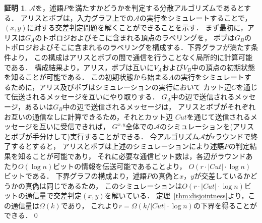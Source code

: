 \documentclass[12pt]{thesis}
\theoremstyle{definition}
\newtheorem*{prf*}{証明}
\begin{document}
\begin{prf*}
$\mathcal{A}$を，述語$P$を満たすかどうかを判定する分散アルゴリズムであるとする．
アリスとボブは，入力グラフ上での$\mathcal{A}$の実行をシミュレートすることで，
$(x, y)$に対する交差判定問題を解くことができることを示す．
まず最初に，アリスは$G_{A}$のトポロジおよびそこに含まれる頂点のラベリングを，
ボブは$G_{B}$のトポロジおよびそこに含まれるのラベリングを構成する．下界グラフが満たす条件より，
この構成はアリスとボブの間で通信を行うことなく局所的に計算可能である．
構成結果より，アリス，ボブは互いに$V_A$および$V_B$中の頂点の初期状態を知ることが可能である．
この初期状態から始まる$A$の実行をシミュレートするために，アリス及びボブはシミュレーションの実行において
カット辺$C$を通じて伝送されるメッセージを互いにやり取りする．
$G_{A}$中の辺で送信されるメッセージ，あるいは$G_{B}$中の辺で送信されるメッセージは，
アリスとボブがそれぞれお互いの通信なしに計算できるため，それとカット辺
$\mathit{Cut}$を通じて送信されるメッセージを互いに受信できれば，
$G^{x,y}$全体での$\mathcal{A}$のシミュレーションを(アリスとボブが手分けして)実行することができる．
今アルゴリズム$\mathcal{A}$が$r$ラウンドで終了するとすると，
アリスとボブは上述のシミュレーションにより述語$P$の判定結果を知ることが可能であり，
それに必要な通信ビット数は，各辺がラウンドあたり$O(\log n)$ビットの情報を伝送可能であることより，
$O(r \cdot |\mathit{Cut}| \cdot \log n)$ビットである．
下界グラフの構成より，述語$P$の真偽と$x$，$y$が交差しているかどうかの真偽は同じであるため，
このシミュレーションは$O(r \cdot |\mathit{Cut}| \cdot \log n)$ビットの通信量で交差判定$(x,y)$を解いている．
定理~\ref{thm:disjointness}より，この通信量は$\Omega(k)$であり，
これより$r = \Omega (k / |\mathit{Cut}| \cdot \log n)$の下界を得ることができる．\qed
\end{prf*}
\end{document}
